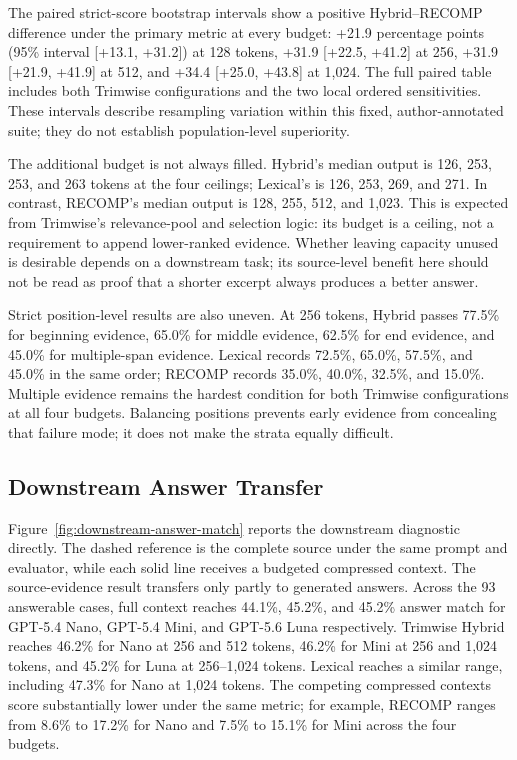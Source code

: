 \documentclass[
]{article}
\begin{document}
The paired strict-score bootstrap intervals show a positive Hybrid--RECOMP difference
under the primary metric at every budget: +21.9 percentage points (95\%
interval [+13.1, +31.2]) at 128 tokens, +31.9 [+22.5, +41.2] at 256,
+31.9 [+21.9, +41.9] at 512, and +34.4 [+25.0, +43.8] at 1,024. The full
paired table includes both Trimwise configurations and the two local ordered
sensitivities. These intervals describe resampling variation within this fixed,
author-annotated suite; they do not establish population-level superiority.

The additional budget is not always filled. Hybrid's median output is
126, 253, 253, and 263 tokens at the four ceilings; Lexical's is 126,
253, 269, and 271. In contrast, RECOMP's median output is 128, 255, 512,
and 1,023. This is expected from Trimwise's relevance-pool and selection
logic: its budget is a ceiling, not a requirement to append lower-ranked
evidence. Whether leaving capacity unused is desirable depends on a
downstream task; its source-level benefit here should not be read as
proof that a shorter excerpt always produces a better answer.

Strict position-level results are also uneven. At 256 tokens, Hybrid
passes 77.5\% for beginning evidence, 65.0\% for middle evidence, 62.5\%
for end evidence, and 45.0\% for multiple-span evidence. Lexical records
72.5\%, 65.0\%, 57.5\%, and 45.0\% in the same order; RECOMP records
35.0\%, 40.0\%, 32.5\%, and 15.0\%. Multiple evidence remains the hardest
condition for both Trimwise configurations at all four budgets. Balancing
positions prevents early evidence from concealing that failure mode; it does
not make the strata equally difficult.

\subsection{Downstream Answer
Transfer}\label{downstream-answer-transfer}

Figure~\ref{fig:downstream-answer-match} reports the downstream diagnostic
directly. The dashed reference is the complete source under the same prompt
and evaluator, while each solid line receives a budgeted compressed context.
The source-evidence result transfers only partly to generated answers.
Across the 93 answerable cases, full context reaches 44.1\%, 45.2\%, and
45.2\% answer match for GPT-5.4 Nano, GPT-5.4 Mini, and GPT-5.6 Luna
respectively. Trimwise Hybrid reaches 46.2\% for Nano at 256 and 512
tokens, 46.2\% for Mini at 256 and 1,024 tokens, and 45.2\% for Luna at
256--1,024 tokens. Lexical reaches a similar range, including 47.3\% for
Nano at 1,024 tokens. The competing compressed contexts score
substantially lower under the same metric; for example, RECOMP ranges
from 8.6\% to 17.2\% for Nano and 7.5\% to 15.1\% for Mini across the
four budgets.
\end{document}

